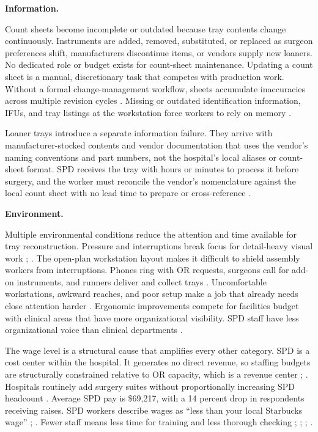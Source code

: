 \documentclass[10pt,a4paper]{article}
\begin{document}
\textbf{Information.}

Count sheets become incomplete or outdated because tray contents change
continuously. Instruments are added, removed, substituted, or replaced as
surgeon preferences shift, manufacturers discontinue items, or vendors supply
new loaners. No dedicated role or budget exists for count-sheet maintenance.
Updating a count sheet is a manual, discretionary task that competes with
production work. Without a formal change-management workflow, sheets accumulate
inaccuracies across multiple revision cycles
\cite{nadeau-2024}. Missing or
outdated identification information, IFUs, and tray listings at the workstation
force workers to rely on memory \cite{lind-2025}.

Loaner trays introduce a separate information failure. They arrive with
manufacturer-stocked contents and vendor documentation that uses the vendor's
naming conventions and part numbers, not the hospital's local aliases or
count-sheet format. SPD receives the tray with hours or minutes to process it
before surgery, and the worker must reconcile the vendor's nomenclature against
the local count sheet with no lead time to prepare or cross-reference
\cite{steris-loaner-trays-2021}.

\textbf{Environment.}

Multiple environmental conditions reduce the attention and time available for
tray reconstruction. Pressure and interruptions break focus for detail-heavy
visual work
\cite{alfred-et-al-2021};
\cite{huang-et-al-2025}. The open-plan
workstation layout makes it difficult to shield assembly workers from
interruptions. Phones ring with OR requests, surgeons call for add-on
instruments, and runners deliver and collect trays
\cite{huang-et-al-2025}. Uncomfortable workstations, awkward reaches, and poor
setup make a job that already needs close attention harder
\cite{osha-central-sterile-supply-accessed-2026}. Ergonomic improvements compete
for facilities budget with clinical areas that have more organizational
visibility. SPD staff have less organizational voice than clinical departments
\cite{surgical-directions-spd-invisible-2025}.

The wage level is a structural cause that amplifies every other category. SPD is
a cost center within the hospital. It generates no direct revenue, so staffing
budgets are structurally constrained relative to OR capacity, which is a revenue
center
\cite{steris-capital-budgeting-2024};
\cite{moab-healthcare-spd-cost-center-2024}. Hospitals routinely add surgery
suites without proportionally increasing SPD headcount
\cite{ingold-2025}. Average
SPD pay is \$69,217, with a 14 percent drop in respondents receiving raises. SPD
workers describe wages as ``less than your local Starbucks wage''
\cite{nadeau-2023-spd-salary-survey};
\cite{perry-circulating-life-spd-2022}. Fewer
staff means less time for training and less thorough checking
\cite{alfred-et-al-2021};
\cite{aorn-staffing-shortage-2025};
\cite{macola-et-al-2025};
\cite{brozak-2025}.
\end{document}
